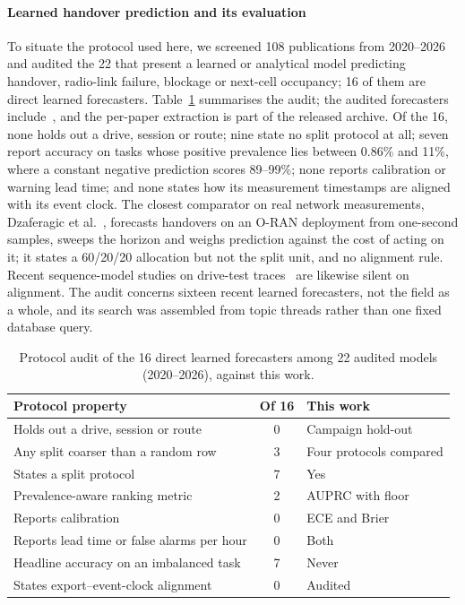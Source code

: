 \documentclass[preprint,review,12pt]{elsarticle}\usepackage{lineno}\linenumbers
\begin{document}
\paragraph{Learned handover prediction and its evaluation} To situate the protocol used here, we screened 108 publications from 2020--2026 and audited the 22 that present a learned or analytical model predicting handover, radio-link failure, blockage or next-cell occupancy; 16 of them are direct learned forecasters. Table~\ref{tab:audit} summarises the audit; the audited forecasters include~\cite{ref15,ref45,ref46,ref54,ref57,ref58,ref59,ref60,ref61,ref62,ref63,ref64,ref65,ref66,ref67,ref68,ref69,ref70}, and the per-paper extraction is part of the released archive. Of the 16, none holds out a drive, session or route; nine state no split protocol at all; seven report accuracy on tasks whose positive prevalence lies between 0.86\% and 11\%, where a constant negative prediction scores 89--99\%; none reports calibration or warning lead time; and none states how its measurement timestamps are aligned with its event clock. The closest comparator on real network measurements, Dzaferagic et al.~\cite{ref54}, forecasts handovers on an O-RAN deployment from one-second samples, sweeps the horizon and weighs prediction against the cost of acting on it; it states a 60/20/20 allocation but not the split unit, and no alignment rule. Recent sequence-model studies on drive-test traces~\cite{ref45,ref46} are likewise silent on alignment. The audit concerns sixteen recent learned forecasters, not the field as a whole, and its search was assembled from topic threads rather than one fixed database query.

\begin{table}[t]
\centering
\caption{Protocol audit of the 16 direct learned forecasters among 22 audited models (2020--2026), against this work.}
\label{tab:audit}
\footnotesize
\begin{tabularx}{\linewidth}{X c l}
\toprule
\textbf{Protocol property} & \textbf{Of 16} & \textbf{This work} \\
\midrule
Holds out a drive, session or route & 0 & Campaign hold-out \\
Any split coarser than a random row & 3 & Four protocols compared \\
States a split protocol & 7 & Yes \\
Prevalence-aware ranking metric & 2 & AUPRC with floor \\
Reports calibration & 0 & ECE and Brier \\
Reports lead time or false alarms per hour & 0 & Both \\
Headline accuracy on an imbalanced task & 7 & Never \\
States export--event-clock alignment & 0 & Audited \\
\bottomrule
\end{tabularx}
\end{table}
\end{document}
